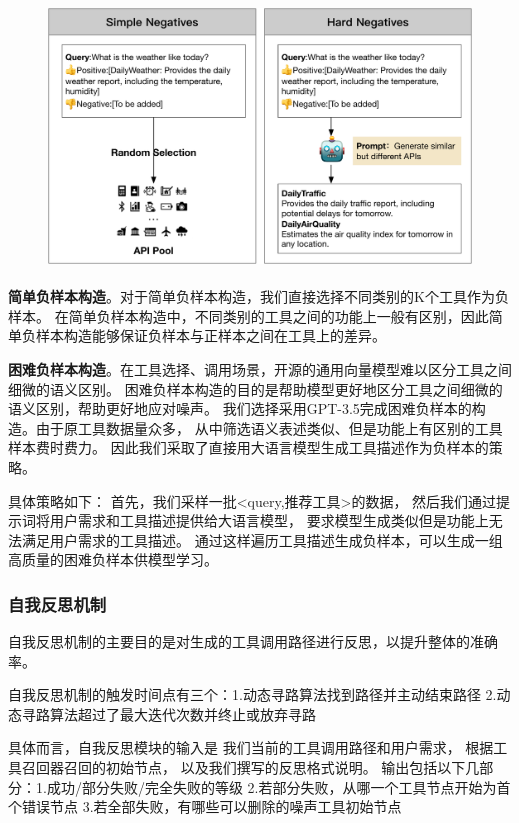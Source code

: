 \begin{figure}[!htp]
  \vspace{1em}
  \centering
  \setlength{\abovecaptionskip}{10pt} %
  \includegraphics[height=7cm]{../assets/ch3-负样本构造.pdf}
  \label{fig:negative-sample-generation}
\end{figure}

\indent \textbf{简单负样本构造}。对于简单负样本构造，我们直接选择不同类别的K个工具作为负样本。
在简单负样本构造中，不同类别的工具之间的功能上一般有区别，因此简单负样本构造能够保证负样本与正样本之间在工具上的差异。

\indent \textbf{困难负样本构造}。在工具选择、调用场景，开源的通用向量模型难以区分工具之间细微的语义区别。
困难负样本构造的目的是帮助模型更好地区分工具之间细微的语义区别，帮助更好地应对噪声。
我们选择采用GPT-3.5完成困难负样本的构造。由于原工具数据量众多，
从中筛选语义表述类似、但是功能上有区别的工具样本费时费力。
因此我们采取了直接用大语言模型生成工具描述作为负样本的策略。

具体策略如下：
首先，我们采样一批<query,推荐工具>的数据，
然后我们通过提示词将用户需求和工具描述提供给大语言模型，
要求模型生成类似但是功能上无法满足用户需求的工具描述。
通过这样遍历工具描述生成负样本，可以生成一组高质量的困难负样本供模型学习。

\subsubsection{自我反思机制}

自我反思机制的主要目的是对生成的工具调用路径进行反思，以提升整体的准确率。

自我反思机制的触发时间点有三个：1.动态寻路算法找到路径并主动结束路径
2.动态寻路算法超过了最大迭代次数并终止或放弃寻路

具体而言，自我反思模块的输入是
我们当前的工具调用路径和用户需求，
根据工具召回器召回的初始节点，
以及我们撰写的反思格式说明。
输出包括以下几部分：1.成功/部分失败/完全失败的等级
2.若部分失败，从哪一个工具节点开始为首个错误节点 3.若全部失败，有哪些可以删除的噪声工具初始节点

